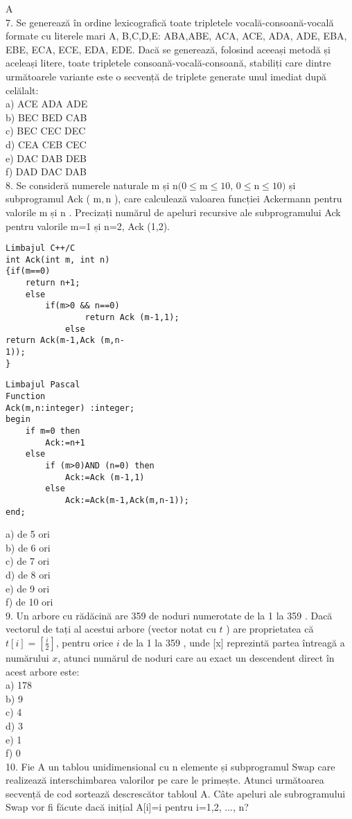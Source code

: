 A\\
7. Se generează în ordine lexicografică toate tripletele vocală-consoană-vocală formate cu literele mari A, B,C,D,E: ABA,ABE, ACA, ACE, ADA, ADE, EBA, EBE, ECA, ECE, EDA, EDE. Dacă se generează, folosind aceeași metodă și aceleași litere, toate tripletele consoană-vocală-consoană, stabiliți care dintre următoarele variante este o secvență de triplete generate unul imediat după celălalt:\\
a) ACE ADA ADE\\
b) BEC BED CAB\\
c) BEC CEC DEC\\
d) CEA CEB CEC\\
e) DAC DAB DEB\\
f) DAD DAC DAB\\
8. Se consideră numerele naturale m și $\mathrm{n}(0 \leq \mathrm{m} \leq 10$, $0 \leq \mathrm{n} \leq 10)$ și subprogramul Ack ( $\mathrm{m}, \mathrm{n}$ ), care calculează valoarea funcției Ackermann pentru valorile m și n . Precizați numărul de apeluri recursive ale subprogramului Ack pentru valorile m=1 și n=2, Ack (1,2).

\begin{verbatim}
Limbajul C++/C
int Ack(int m, int n)
{if(m==0)
    return n+1;
    else
        if(m>0 && n==0)
                return Ack (m-1,1);
            else
return Ack(m-1,Ack (m,n-
1));
}
\end{verbatim}

\begin{verbatim}
Limbajul Pascal
Function
Ack(m,n:integer) :integer;
begin
    if m=0 then
        Ack:=n+1
    else
        if (m>0)AND (n=0) then
            Ack:=Ack (m-1,1)
        else
            Ack:=Ack(m-1,Ack(m,n-1));
end;
\end{verbatim}

a) de 5 ori\\
b) de 6 ori\\
c) de 7 ori\\
d) de 8 ori\\
e) de 9 ori\\
f) de 10 ori\\
9. Un arbore cu rădăcină are 359 de noduri numerotate de la 1 la 359 . Dacă vectorul de tați al acestui arbore (vector notat cu $t$ ) are proprietatea că $t[i]=\left[\frac{i}{2}\right]$, pentru orice $i$ de la 1 la 359 , unde [x] reprezintă partea întreagă a numărului $x$, atunci numărul de noduri care au exact un descendent direct în acest arbore este:\\
a) 178\\
b) 9\\
c) 4\\
d) 3\\
e) 1\\
f) 0\\[0pt]
10. Fie A un tablou unidimensional cu n elemente și subprogramul Swap care realizează interschimbarea valorilor pe care le primește. Atunci următoarea secvență de cod sortează descrescător tabloul A. Câte apeluri ale subrogramului Swap vor fi făcute dacă inițial A[i]=i pentru i=1,2, ..., n?

